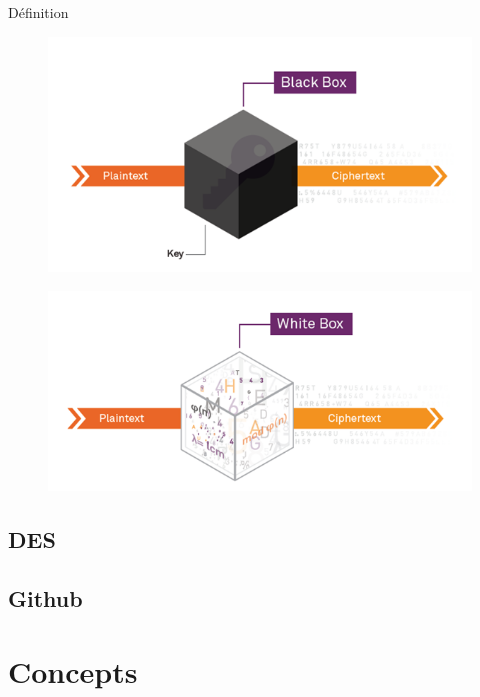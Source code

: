 \documentclass{beamer}
\begin{document}
\begin{frame}{Définition}

  \begin{figure}[h]
    \centering
    \includegraphics[scale=0.30]{./images/blackbox.png}
  \end{figure}

  \begin{figure}[h]
    \centering
    \includegraphics[scale=0.30]{./images/whitebox.png}
  \end{figure}

\end{frame}

\subsection{DES}

\subsection{Github}

\section{Concepts}
\end{document}

